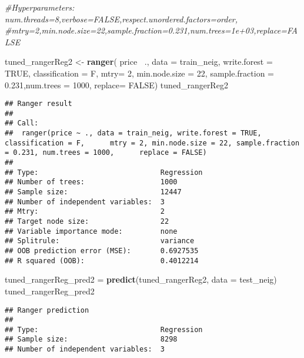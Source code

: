 \documentclass[
]{article}
\newenvironment{Shaded}{\begin{snugshade}}{\end{snugshade}}
\newcommand{\CommentTok}[1]{\textcolor[rgb]{0.56,0.35,0.01}{\textit{#1}}}
\newcommand{\DataTypeTok}[1]{\textcolor[rgb]{0.13,0.29,0.53}{#1}}
\newcommand{\DecValTok}[1]{\textcolor[rgb]{0.00,0.00,0.81}{#1}}
\newcommand{\FloatTok}[1]{\textcolor[rgb]{0.00,0.00,0.81}{#1}}
\newcommand{\KeywordTok}[1]{\textcolor[rgb]{0.13,0.29,0.53}{\textbf{#1}}}
\newcommand{\NormalTok}[1]{#1}
\newcommand{\OperatorTok}[1]{\textcolor[rgb]{0.81,0.36,0.00}{\textbf{#1}}}
\newcommand{\OtherTok}[1]{\textcolor[rgb]{0.56,0.35,0.01}{#1}}
\newcommand{\StringTok}[1]{\textcolor[rgb]{0.31,0.60,0.02}{#1}}
\begin{document}
\begin{Shaded}
\begin{Highlighting}[]
\CommentTok{#Hyperparameters: num.threads=8,verbose=FALSE,respect.unordered.factors=order,}
\CommentTok{#mtry=2,min.node.size=22,sample.fraction=0.231,num.trees=1e+03,replace=FALSE}

\NormalTok{tuned_rangerReg2 <-}\StringTok{ }\KeywordTok{ranger}\NormalTok{( price}\OperatorTok{~}\StringTok{ }\NormalTok{., }\DataTypeTok{data =}\NormalTok{ train_neig, }\DataTypeTok{write.forest =} \OtherTok{TRUE}\NormalTok{, }\DataTypeTok{classification =}\NormalTok{ F, }\DataTypeTok{mtry=} \DecValTok{2}\NormalTok{, }
                           \DataTypeTok{min.node.size =} \DecValTok{22}\NormalTok{, }\DataTypeTok{sample.fraction =} \FloatTok{0.231}\NormalTok{,}\DataTypeTok{num.trees =} \DecValTok{1000}\NormalTok{, }\DataTypeTok{replace=} \OtherTok{FALSE}\NormalTok{)}
\NormalTok{tuned_rangerReg2}
\end{Highlighting}
\end{Shaded}

\begin{verbatim}
## Ranger result
## 
## Call:
##  ranger(price ~ ., data = train_neig, write.forest = TRUE, classification = F,      mtry = 2, min.node.size = 22, sample.fraction = 0.231, num.trees = 1000,      replace = FALSE) 
## 
## Type:                             Regression 
## Number of trees:                  1000 
## Sample size:                      12447 
## Number of independent variables:  3 
## Mtry:                             2 
## Target node size:                 22 
## Variable importance mode:         none 
## Splitrule:                        variance 
## OOB prediction error (MSE):       0.6927535 
## R squared (OOB):                  0.4012214
\end{verbatim}

\begin{Shaded}
\begin{Highlighting}[]
\NormalTok{tuned_rangerReg_pred2 =}\StringTok{ }\KeywordTok{predict}\NormalTok{(tuned_rangerReg2, }\DataTypeTok{data =}\NormalTok{ test_neig)}
\NormalTok{tuned_rangerReg_pred2}
\end{Highlighting}
\end{Shaded}

\begin{verbatim}
## Ranger prediction
## 
## Type:                             Regression 
## Sample size:                      8298 
## Number of independent variables:  3
\end{verbatim}
\end{document}
